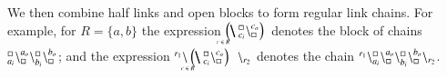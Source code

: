 We then combine half links and  open blocks to form regular link chains.
%
 For example, for $R = \{a,b\}$ the expression $ \blockchain{c_i}{c_o}{c \in R} $\;
denotes the block of chains ${}_{a_i}^{\scriptstyle {\square}}\backslash_{\scriptstyle {\square}}^{a_o} \backslash{}_{b_i}^{\scriptstyle {\square}}\backslash_{\scriptstyle {\square}}^{b_o}$; and the expression $\link{r_1}{} \blockchain{c_i}{c_o}{c \in R}\;\link{}{r_2} $ denotes the chain $ {}^{r_1}\backslash_{a_i}^{\scriptstyle {\square}}\backslash_{\scriptstyle {\square}}^{a_o}\backslash_{b_i}^{\scriptstyle {\square}}\backslash_{\scriptstyle {\square}}^{b_o}\backslash_{r_2}$.
